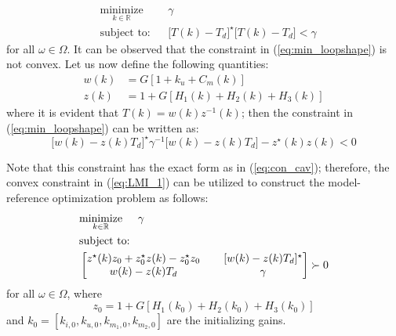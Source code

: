 \documentclass[a4paper, 10pt, conference]{ieeeconf}
\begin{document}
 \begin{equation} \label{eq:min_loopshape}
\begin{aligned}
& \underset{ k \in \mathbb{R}}{\text{minimize}}
& & \gamma  \\
& \text{subject to:} & & \bigl[T(k)-T_d\bigr]^{\star}\bigl[T(k)-T_d\bigr] < \gamma
\end{aligned}
\end{equation}
for all $\omega \in \Omega$. It can be observed that the constraint in (\ref{eq:min_loopshape}) is not convex. Let us now define the following quantities:
\begin{equation} 
\begin{aligned}
w(k) &= G[1+k_u+C_m(k)] \\
z(k) &= 1+G[H_1(k)+H_2(k)+H_3(k)]
\end{aligned}
\end{equation}
where it is evident that $T(k) = w(k)z^{-1}(k)$; then the constraint in (\ref{eq:min_loopshape}) can be written as:
$$
\bigl[w(k)-z(k)T_d \bigr]^{\star}\gamma^{-1} \bigl[w(k)-z(k)T_d \bigr] - z^{\star}(k)z(k)<0
$$

Note that this constraint has the exact form as in (\ref{eq:con_cav}); therefore, the convex constraint in (\ref{eq:LMI_1}) can be utilized to construct the model-reference optimization problem as follows:
\begin{equation} \label{eq:loop_shape_LMI_inf}
\begin{aligned}
& \underset{ k \in \mathbb{R}}{\text{minimize}} \hspace{0.5cm} \gamma  \\
& \text{subject to:} \\
&
\begin{bmatrix}
z^{\star}(k)z_0 + z_0^{\star}z(k) - z_0^{\star}z_0 & \phantom{xx}[w(k)-z(k)T_d]^{\star} \\ 
w(k)-z(k)T_d & \phantom{xx}\gamma
\end{bmatrix} \succ 0
\end{aligned}
\end{equation}
for all $\omega \in \Omega$, where $$z_0 = 1+G[H_1(k_0) + H_2(k_0)+H_3(k_0)]$$ and $k_0 =[k_{i,0},k_{u,0},k_{m_1,0},k_{m_2,0}  ]$ are the initializing gains. 
\end{document}
